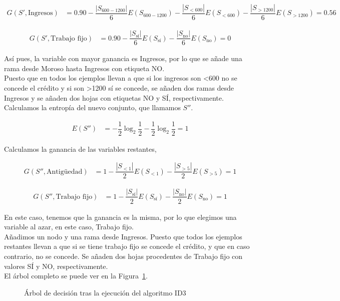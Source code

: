 \begin{ejemplo}
	\begin{align*}
	G(S', \text{Ingresos}) & = 0.90 - \dfrac{|S_{600-1200}|}{6}E(S_{600-1200}) - \dfrac{|S_{<600}|}{6}E(S_{<600}) - \dfrac{|S_{>1200}|}{6}E(S_{>1200}) = 0.56
	\end{align*}
	
	\begin{align*}
	G(S', \text{Trabajo fijo}) & = 0.90 - \dfrac{|S_{\text{sí}}|}{6}E(S_{\text{sí}}) - \dfrac{|S_{\text{no}}|}{6}E(S_{\text{no}}) = 0 
	\end{align*}
	
	Así pues, la variable con mayor ganancia es Ingresos, por lo que se añade una rama desde Moroso hasta Ingresos con etiqueta NO.\\
	
	Puesto que en todos los ejemplos llevan a que si los ingresos son <600 no se concede el crédito y si son >1200 sí se concede, se añaden dos ramas desde Ingresos y se añaden dos hojas con etiquetas NO y SÍ, respectivamente.\\
	
	Calculamos la entropía del nuevo conjunto, que llamamos $S''$.
	
	\begin{align*}
	E(S'') & = -\dfrac{1}{2}\log_2 \dfrac{1}{2} - \dfrac{1}{2}\log_2 \dfrac{1}{2}  = 1
	\end{align*}
	
	Calculamos la ganancia de las variables restantes,
	
	\begin{align*}
	G(S'', \text{Antigüedad}) & = 1 - \dfrac{|S_{<1}|}{2}E(S_{<1}) - \dfrac{|S_{>5}|}{2}E(S_{>5}) = 1
	\end{align*}
	
	\begin{align*}
	G(S'', \text{Trabajo fijo}) & = 1 - \dfrac{|S_{\text{sí}}|}{2} E(S_{\text{sí}}) - \dfrac{|S_\text{no}|}{2} E(S_\text{no}) = 1
	\end{align*}
	
	En este caso, tenemos que la ganancia es la misma, por lo que elegimos una variable al azar, en este caso, Trabajo fijo.\\
	
	Añadimos un nodo y una rama desde Ingresos. Puesto que todos los ejemplos restantes llevan a que si se tiene trabajo fijo se concede el crédito, y que en caso contrario, no se concede. Se añaden dos hojas procedentes de Trabajo fijo con valores SÍ y NO, respectivamente.\\
	
	El árbol completo se puede ver en la Figura~\ref{fig:arboldecisionejemplo}.\\
	
	\begin{figure}[htbp!]
		\centering
		\ejemploarboldecision
		\caption{Árbol de decisión tras la ejecución del algoritmo ID3}
		\label{fig:arboldecisionejemplo}
	\end{figure}
\end{ejemplo}

